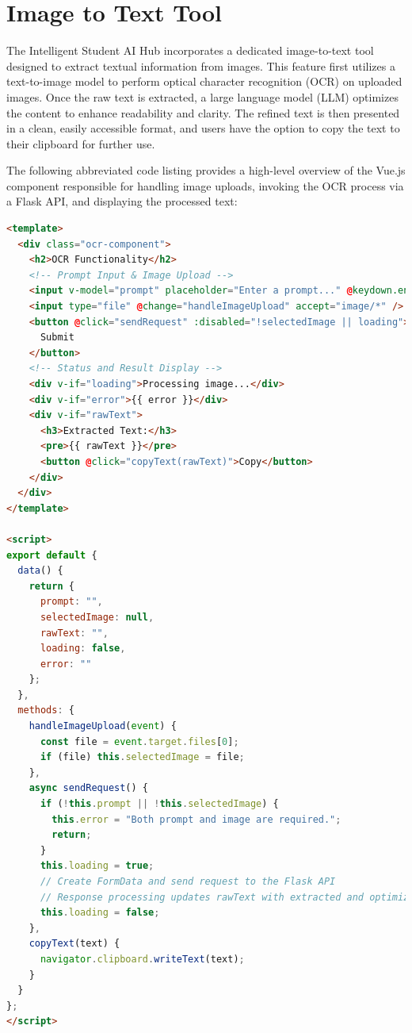 \section{Image to Text Tool}

The Intelligent Student AI Hub incorporates a dedicated image-to-text tool designed to extract textual information from images. This feature first utilizes a text-to-image model to perform optical character recognition (OCR) on uploaded images. Once the raw text is extracted, a large language model (LLM) optimizes the content to enhance readability and clarity. The refined text is then presented in a clean, easily accessible format, and users have the option to copy the text to their clipboard for further use.

The following abbreviated code listing provides a high-level overview of the Vue.js component responsible for handling image uploads, invoking the OCR process via a Flask API, and displaying the processed text:

\begin{lstlisting}[language=html, caption={Abbreviated Vue.js Component for Image-to-Text Conversion}, frame=single]
<template>
  <div class="ocr-component">
    <h2>OCR Functionality</h2>
    <!-- Prompt Input & Image Upload -->
    <input v-model="prompt" placeholder="Enter a prompt..." @keydown.enter="sendRequest" />
    <input type="file" @change="handleImageUpload" accept="image/*" />
    <button @click="sendRequest" :disabled="!selectedImage || loading">
      Submit
    </button>
    <!-- Status and Result Display -->
    <div v-if="loading">Processing image...</div>
    <div v-if="error">{{ error }}</div>
    <div v-if="rawText">
      <h3>Extracted Text:</h3>
      <pre>{{ rawText }}</pre>
      <button @click="copyText(rawText)">Copy</button>
    </div>
  </div>
</template>

<script>
export default {
  data() {
    return {
      prompt: "",
      selectedImage: null,
      rawText: "",
      loading: false,
      error: ""
    };
  },
  methods: {
    handleImageUpload(event) {
      const file = event.target.files[0];
      if (file) this.selectedImage = file;
    },
    async sendRequest() {
      if (!this.prompt || !this.selectedImage) {
        this.error = "Both prompt and image are required.";
        return;
      }
      this.loading = true;
      // Create FormData and send request to the Flask API
      // Response processing updates rawText with extracted and optimized text
      this.loading = false;
    },
    copyText(text) {
      navigator.clipboard.writeText(text);
    }
  }
};
</script>
\end{lstlisting}


